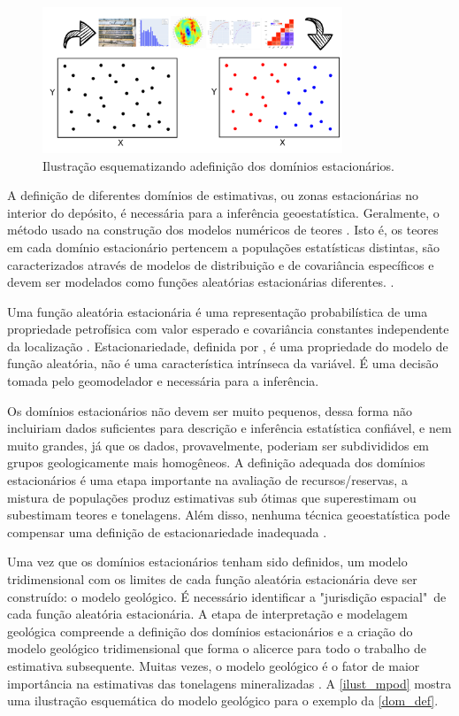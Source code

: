 \begin{figure}[H]
	\centering
	\caption{\label{dom_def}Ilustração esquematizando adefinição dos domínios estacionários.}
	\includegraphics[width=0.8\textwidth]{capitulo_1/imagens/dom_def}
\end{figure}

A definição de diferentes domínios de estimativas, ou zonas estacionárias no interior do depósito, é necessária para a inferência geoestatística. Geralmente, o método usado na construção dos modelos numéricos de teores \cite{mclennanstationarity}. Isto é, os teores em cada domínio estacionário pertencem a populações estatísticas distintas, são caracterizados através de modelos de distribuição e de covariância específicos e devem ser modelados como funções aleatórias estacionárias diferentes. \cite{journel1978mining}. 

Uma função aleatória estacionária é uma representação probabilística de uma propriedade petrofísica com valor esperado e covariância constantes independente da localização \cite{mclennanstationarity}. Estacionariedade, definida por , é uma propriedade do modelo de função aleatória, não é uma característica intrínseca da variável. É uma decisão tomada pelo geomodelador e necessária para a inferência.

Os domínios estacionários não devem ser muito pequenos, dessa forma não incluiriam dados suficientes para descrição e inferência estatística confiável, e nem muito grandes, já que os dados, provavelmente, poderiam ser subdivididos em grupos geologicamente mais homogêneos. A definição adequada dos domínios estacionários é uma etapa importante na avaliação de recursos/reservas, a mistura de populações produz estimativas sub ótimas que superestimam ou subestimam teores e tonelagens. Além disso, nenhuma técnica geoestatística pode compensar uma definição de estacionariedade inadequada \cite{rossi2013mineral}.

Uma vez que os domínios estacionários tenham sido definidos, um modelo tridimensional com os limites de cada função aleatória estacionária deve ser construído: o modelo geológico. É necessário identificar a "jurisdição espacial"\ de cada função aleatória estacionária. A etapa de interpretação e modelagem geológica compreende a definição dos domínios estacionários e a criação do modelo geológico tridimensional que forma o alicerce para todo o trabalho de estimativa subsequente. Muitas vezes, o modelo geológico é o fator de maior importância na estimativas das tonelagens mineralizadas \cite{rossi2013mineral}. A \autoref{ilust_mpod} mostra uma ilustração esquemática do modelo geológico para o exemplo da \autoref{dom_def}.

